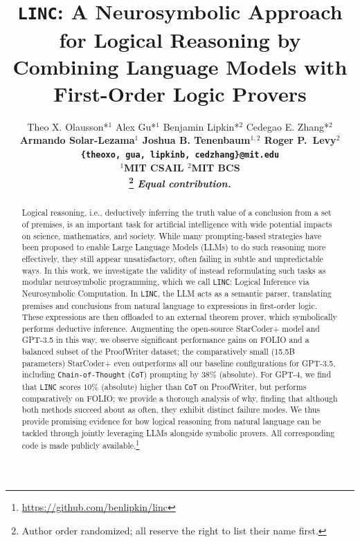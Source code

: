 \documentclass[11pt]{article}
\title{\emojilink\texttt{LINC}: A Neurosymbolic Approach for Logical Reasoning by Combining Language Models with First-Order Logic Provers}
\author{Theo X. Olausson*$^1$ \quad Alex Gu*$^1$ \quad Benjamin Lipkin*$^2$ \quad Cedegao E. Zhang*$^2$ \\
\bf Armando Solar-Lezama$^1$ \quad Joshua B. Tenenbaum$^{1,2}$ \quad Roger P.\ Levy$^2$ \\
\texttt{\{theoxo, gua, lipkinb, cedzhang\}@mit.edu} \\
$^1$MIT CSAIL $^2$MIT BCS \\
\thanks{\quad Author order randomized; all reserve the right to list their name first.}
\textit{Equal contribution.}
\\
}
\begin{document}
\maketitle

\begin{abstract}
Logical reasoning, i.e., deductively inferring the truth value of a conclusion from a set of premises, is an important task for artificial intelligence with wide potential impacts on science, mathematics, and society.
While many prompting-based strategies have been proposed to enable Large Language Models (LLMs) to do such reasoning more effectively,
they still appear unsatisfactory, often failing in subtle and unpredictable ways.
In this work, we investigate the validity of instead reformulating such tasks as modular neurosymbolic programming, which we call \texttt{LINC}: Logical Inference via Neurosymbolic Computation.
In \texttt{LINC}, the LLM acts as a semantic parser, translating premises and conclusions from natural language to expressions in first-order logic.
These expressions are then offloaded to an external theorem prover, which symbolically performs deductive inference.
Augmenting the open-source StarCoder+ model and GPT-3.5 in this way, we observe significant performance gains on FOLIO and a balanced subset of the ProofWriter dataset;
the comparatively small (15.5B parameters) StarCoder+ even outperforms all our baseline configurations for GPT-3.5, including \texttt{Chain-of-Thought} (\texttt{CoT}) prompting by 38\% (absolute).
For GPT-4, we find that \texttt{LINC} scores 10\% (absolute) higher than \texttt{CoT} on ProofWriter, but performs comparatively on FOLIO; we provide a thorough analysis of why, finding that although both methods succeed about as often, they exhibit distinct failure modes.
We thus provide promising evidence for how logical reasoning from natural language can be tackled through jointly leveraging LLMs alongside symbolic provers.
All corresponding code 
is made publicly available.\footnote{\quad \url{https://github.com/benlipkin/linc}}
\end{abstract}

\end{document}

